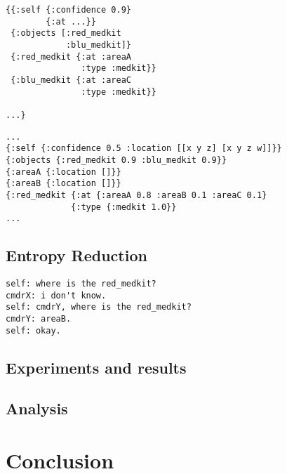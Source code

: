 \documentclass[12pt]{article}
\begin{document}
\begin{verbatim}
{{:self {:confidence 0.9}
        {:at ...}}
 {:objects [:red_medkit
            :blu_medkit]}
 {:red_medkit {:at :areaA
               :type :medkit}}
 {:blu_medkit {:at :areaC
               :type :medkit}}

...}
\end{verbatim}

\begin{verbatim}
...
{:self {:confidence 0.5 :location [[x y z] [x y z w]]}}
{:objects {:red_medkit 0.9 :blu_medkit 0.9}}
{:areaA {:location []}}
{:areaB {:location []}}
{:red_medkit {:at {:areaA 0.8 :areaB 0.1 :areaC 0.1}
             {:type {:medkit 1.0}}
...
\end{verbatim}

\subsection{Entropy Reduction}
\begin{verbatim}
self: where is the red_medkit?
cmdrX: i don't know.
self: cmdrY, where is the red_medkit?
cmdrY: areaB.
self: okay.
\end{verbatim}

\subsection{Experiments and results}


\subsection{Analysis}

\section{Conclusion}


{\small }
\end{document}
